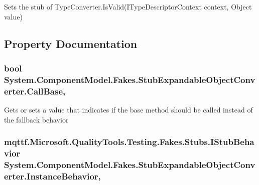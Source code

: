 Sets the stub of Type\-Converter.\-Is\-Valid(\-I\-Type\-Descriptor\-Context context, Object value)



\subsection{Property Documentation}
\hypertarget{class_system_1_1_component_model_1_1_fakes_1_1_stub_expandable_object_converter_a5c801c545b07ca87c10062b7e0b38117}{
\subsubsection[{Call\-Base}]{\setlength{\rightskip}{0pt plus 5cm}bool System.\-Component\-Model.\-Fakes.\-Stub\-Expandable\-Object\-Converter.\-Call\-Base\hspace{0.3cm}{\ttfamily [get]}, {\ttfamily [set]}}}\label{class_system_1_1_component_model_1_1_fakes_1_1_stub_expandable_object_converter_a5c801c545b07ca87c10062b7e0b38117}


Gets or sets a value that indicates if the base method should be called instead of the fallback behavior

\hypertarget{class_system_1_1_component_model_1_1_fakes_1_1_stub_expandable_object_converter_a4247adb531d9dbabcfaf73d9886ea781}{
\subsubsection[{Instance\-Behavior}]{\setlength{\rightskip}{0pt plus 5cm}mqttf.\-Microsoft.\-Quality\-Tools.\-Testing.\-Fakes.\-Stubs.\-I\-Stub\-Behavior System.\-Component\-Model.\-Fakes.\-Stub\-Expandable\-Object\-Converter.\-Instance\-Behavior\hspace{0.3cm}{\ttfamily [get]}, {\ttfamily [set]}}}\label{class_system_1_1_component_model_1_1_fakes_1_1_stub_expandable_object_converter_a4247adb531d9dbabcfaf73d9886ea781}


